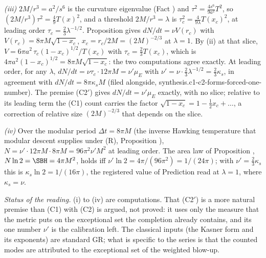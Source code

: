 \emph{(iii)} $2M/r^{3} = a^{2}/s^{6}$ is the curvature eigenvalue (Fact ) and $\tau^{2} = \tfrac{4s^{6}}{9a^{2}}T^{2}$, so $(2M/r^{3})\tau^{2} = \tfrac49 T(x)^{2}$, and a threshold $2M/r^{3} = \lambda$ is $\tau_{c}^{2} = \tfrac{4}{9\lambda}T(x_{c})^{2}$, at leading order $\tau_{c} = \tfrac23\lambda^{-1/2}$. Proposition  gives $dN/dt = \nu V(r_{c})$ with $V(r_{c}) = 8\pi M\sqrt{1 - x_{c}}$, $x_{c} = r_{c}/2M = (2M)^{-2/3}$ at $\lambda = 1$. By (ii) at that slice, $V = 6\pi a^{2}\,\tau_{c}(1 - x_{c})^{1/2}/T(x_{c})$ with $\tau_{c} = \tfrac23 T(x_{c})$, which is $4\pi a^{2}(1 - x_{c})^{1/2} = 8\pi M\sqrt{1 - x_{c}}$: the two computations agree exactly. At leading order, for any $\lambda$, $dN/dt = \nu\tau_{c}\cdot 12\pi M = \nu'\mu_{E}$ with $\nu' = \nu\cdot\tfrac23\lambda^{-1/2} = \tfrac23\kappa_{s}$, in agreement with $dN/dt = 8\pi\kappa_{s}M$ (filed alongside, synthesis.c1-c2-forms-forced-one-number). The premise (C2$'$) gives $dN/dt = \nu'\mu_{E}$ exactly, with no slice; relative to its leading term the (C1) count carries the factor $\sqrt{1 - x_{c}} = 1 - \tfrac12 x_{c} + \dots$, a correction of relative size $(2M)^{-2/3}$ that depends on the slice.

\emph{(iv)} Over the modular period $\Delta t = 8\pi M$ (the inverse Hawking temperature that modular descent supplies under (R), Proposition ), $N = \nu'\cdot 12\pi M\cdot 8\pi M = 96\pi^{2}\nu' M^{2}$ at leading order. The area law of Proposition , $N\ln 2 = \SBH = 4\pi M^{2}$, holds iff $\nu'\ln 2 = 4\pi/(96\pi^{2}) = 1/(24\pi)$; with $\nu' = \tfrac23\kappa_{s}$ this is $\kappa_{s}\ln 2 = 1/(16\pi)$, the registered value of Prediction  read at $\lambda = 1$, where $\kappa_{s} = \nu$.

\emph{Status of the reading.} (i) to (iv) are computations. That (C2$'$) is a more natural premise than (C1) with (C2) is argued, not proved: it uses only the measure that the metric puts on the exceptional set the completion already contains, and its one number $\nu'$ is the calibration left. The classical inputs (the Kasner form and its exponents) are standard GR; what is specific to the series is that the counted modes are attributed to the exceptional set of the weighted blow-up.
